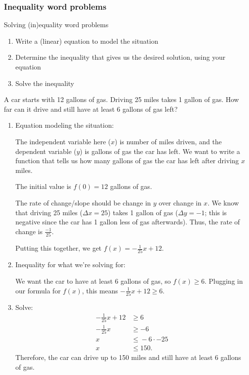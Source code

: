 \documentclass{article}
\begin{document}
\subsubsection{Inequality word problems}


\begin{process}{Solving (in)equality word problems}{}
    \begin{enumerate}
        \item Write a (linear) equation to model the situation
        \item Determine the inequality that gives us the desired solution, using your equation
        \item Solve the inequality
    \end{enumerate}
\end{process}

\begin{example}{}{}
    A car starts with 12 gallons of gas. Driving 25 miles takes 1 gallon of gas. How far can it drive and still have at least 6 gallons of gas left?
\end{example}

\begin{solution}
    \begin{enumerate}
        \item Equation modeling the situation:
        
        The independent variable here ($x$) is number of miles driven, and the dependent variable ($y$) is gallons of gas the car has left. We want to write a function that tells us how many gallons of gas the car has left after driving $x$ miles.

        The initial value is $f(0)=12$ gallons of gas.

        The rate of change/slope should be change in $y$ over change in $x$. We know that driving 25 miles ($\Delta x=25$) takes 1 gallon of gas ($\Delta y=-1$; this is negative since the car has 1 gallon less of gas afterwards). Thus, the rate of change is $\frac{-1}{25}$.

        Putting this together, we get $f(x)=-\frac{1}{25}x+12$.
        \item Inequality for what we're solving for:
        
        We want the car to have at least 6 gallons of gas, so $f(x)\geq 6$. Plugging in our formula for $f(x)$, this means $-\frac{1}{25}x+12\geq 6$.

        \item Solve:
        \begin{align*}
            -\frac{1}{25}x+12&\geq 6\\
            -\frac{1}{25}x&\geq -6\\
            x\;&\boxed{\leq}-6\cdot -25\\
            x&\leq 150.
        \end{align*}
        Therefore, the car can drive up to 150 miles and still have at least 6 gallons of gas.
    \end{enumerate}
\end{solution}
\end{document}
